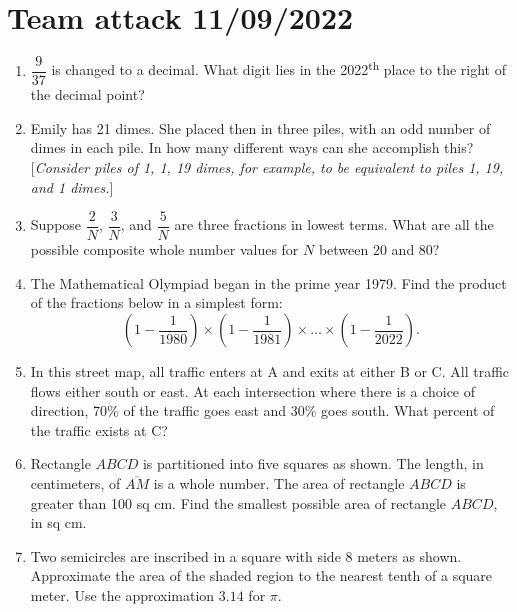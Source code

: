 \documentclass[11pt]{article}
\begin{document}
  \section*{Team attack 11/09/2022}
  \begin{enumerate}[leftmargin=3mm]
    \item $\dfrac{9}{37}$ is changed to a decimal. What digit lies in the 2022\textsuperscript{th} place to the right of the decimal point? %
    \item Emily has 21 dimes. She placed then in three piles, with an odd number of dimes in each pile. In how many different ways can she accomplish this? [\emph{Consider piles of 1, 1, 19 dimes, for example, to be equivalent to piles 1, 19, and 1 dimes.}] %
    \item Suppose $\dfrac{2}{N}$, $\dfrac{3}{N}$, and $\dfrac{5}{N}$ are three fractions in lowest terms. What are all the possible composite whole number values for $N$ between $20$ and $80$? %
    \item The Mathematical Olympiad began in the prime year 1979. Find the product of the fractions below in a simplest form:
    \[ 
      \left(1 - \frac{1}{1980}\right) \times \left(1 - \frac{1}{1981}\right) \times \ldots \times \left(1 - \frac{1}{2022}\right). 
    \] %
    \item In this street map, all traffic enters at A and exits at either B or C. All traffic flows either south or east. At each intersection where there is a choice of direction, 70\% of the traffic goes east and 30\% goes south. What percent of the traffic exists at C? %
    \item Rectangle $ABCD$ is partitioned into five squares as shown. The length, in centimeters, of $\overline{AM}$ is a whole number. The area of rectangle $ABCD$ is greater than 100 sq cm. Find the smallest possible area of rectangle $ABCD$, in sq cm. %
    \item Two semicircles are inscribed in a square with side $8$ meters as shown. Approximate the area of the shaded region to the nearest tenth of a square meter. Use the approximation $3.14$ for $\pi$. %
  \end{enumerate}
\end{document}
